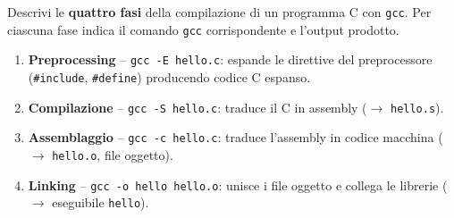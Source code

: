 \question[4]
Descrivi le \textbf{quattro fasi} della compilazione di un programma C con \lstinline|gcc|.
Per ciascuna fase indica il comando \lstinline|gcc| corrispondente e l'output prodotto.
\begin{solution}
\begin{enumerate}[label=\arabic*.,nosep]
  \item \textbf{Preprocessing} -- \lstinline|gcc -E hello.c|: espande le direttive del preprocessore (\lstinline|#include|, \lstinline|#define|) producendo codice C espanso.
  \item \textbf{Compilazione} -- \lstinline|gcc -S hello.c|: traduce il C in assembly ($\to$ \lstinline|hello.s|).
  \item \textbf{Assemblaggio} -- \lstinline|gcc -c hello.c|: traduce l'assembly in codice macchina ($\to$ \lstinline|hello.o|, file oggetto).
  \item \textbf{Linking} -- \lstinline|gcc -o hello hello.o|: unisce i file oggetto e collega le librerie ($\to$ eseguibile \lstinline|hello|).
\end{enumerate}
\end{solution}
